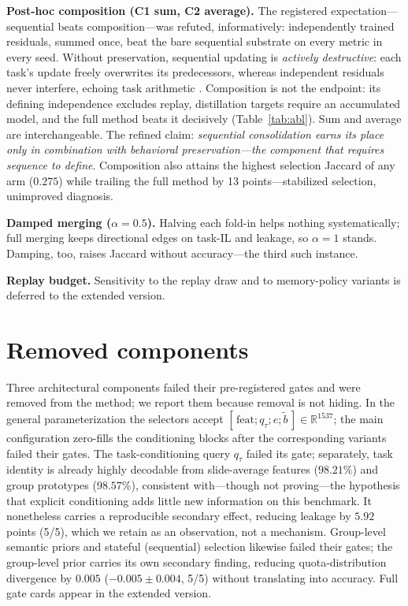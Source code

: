 \documentclass{article}
\begin{document}
\textbf{Post-hoc composition (C1 sum, C2 average).} The registered expectation---sequential beats composition---was refuted, informatively: independently trained residuals, summed once, beat the bare sequential substrate on every metric in every seed. Without preservation, sequential updating is \emph{actively destructive}: each task's update freely overwrites its predecessors, whereas independent residuals never interfere, echoing task arithmetic \cite{ilharco2023task}. Composition is not the endpoint: its defining independence excludes replay, distillation targets require an accumulated model, and the full method beats it decisively (Table~\ref{tab:abl}). Sum and average are interchangeable. The refined claim: \emph{sequential consolidation earns its place only in combination with behavioral preservation---the component that requires sequence to define}. Composition also attains the highest selection Jaccard of any arm ($0.275$) while trailing the full method by 13 points---stabilized selection, unimproved diagnosis.

\textbf{Damped merging ($\alpha{=}0.5$).} Halving each fold-in helps nothing systematically; full merging keeps directional edges on task-IL and leakage, so $\alpha{=}1$ stands. Damping, too, raises Jaccard without accuracy---the third such instance.

\textbf{Replay budget.} Sensitivity to the replay draw and to memory-policy variants is deferred to the extended version.

\section{Removed components}
\label{sec:removed}
Three architectural components failed their pre-registered gates and were removed from the method; we report them because removal is not hiding. In the general parameterization the selectors accept $[\,\mathrm{feat};q_\tau;e;\tilde b\,]\in\mathbb{R}^{1537}$; the main configuration zero-fills the conditioning blocks after the corresponding variants failed their gates. The task-conditioning query $q_\tau$ failed its gate; separately, task identity is already highly decodable from slide-average features ($98.21\%$) and group prototypes ($98.57\%$), consistent with---though not proving---the hypothesis that explicit conditioning adds little new information on this benchmark. It nonetheless carries a reproducible secondary effect, reducing leakage by $5.92$ points (5/5), which we retain as an observation, not a mechanism. Group-level semantic priors and stateful (sequential) selection likewise failed their gates; the group-level prior carries its own secondary finding, reducing quota-distribution divergence by $0.005$ ($-0.005{\pm}0.004$, 5/5) without translating into accuracy. Full gate cards appear in the extended version.
\end{document}
